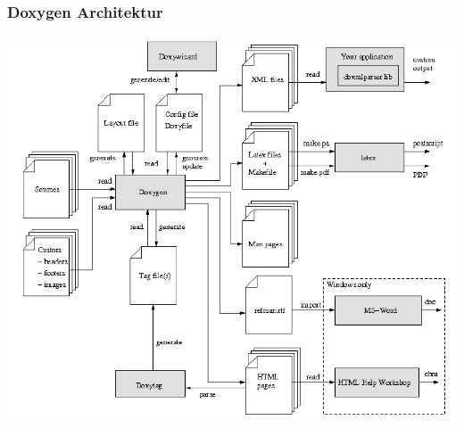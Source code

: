 \subsubsection{Doxygen Architektur}
\vspace{3cm}
\includegraphics[width = \linewidth, angle = 90]{images/doxygen}
\clearpage
